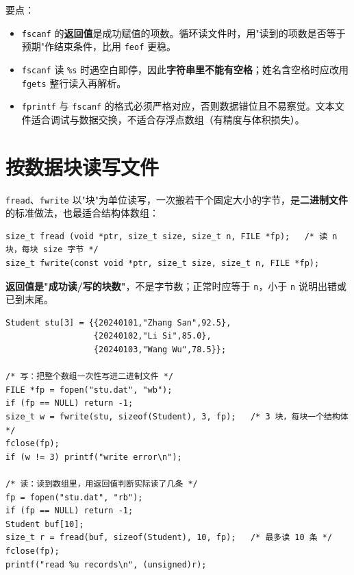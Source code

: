 要点：
\begin{itemize}
  \item \texttt{fscanf} 的\textbf{返回值}是成功赋值的项数。循环读文件时，用"读到的项数是否等于预期"作结束条件，比用 \texttt{feof} 更稳。
  \item \texttt{fscanf} 读 \texttt{\%s} 时遇空白即停，因此\textbf{字符串里不能有空格}；姓名含空格时应改用 \texttt{fgets} 整行读入再解析。
  \item \texttt{fprintf} 与 \texttt{fscanf} 的格式必须严格对应，否则数据错位且不易察觉。文本文件适合调试与数据交换，不适合存浮点数组（有精度与体积损失）。
\end{itemize}

\section{按数据块读写文件}
\texttt{fread}、\texttt{fwrite} 以"块"为单位读写，一次搬若干个固定大小的字节，是\textbf{二进制文件}的标准做法，也最适合结构体数组：
\begin{lstlisting}
size_t fread (void *ptr, size_t size, size_t n, FILE *fp);   /* 读 n 块，每块 size 字节 */
size_t fwrite(const void *ptr, size_t size, size_t n, FILE *fp);
\end{lstlisting}
\textbf{返回值是"成功读/写的块数"}，不是字节数；正常时应等于 \texttt{n}，小于 \texttt{n} 说明出错或已到末尾。

\begin{lstlisting}
Student stu[3] = {{20240101,"Zhang San",92.5},
                  {20240102,"Li Si",85.0},
                  {20240103,"Wang Wu",78.5}};

/* 写：把整个数组一次性写进二进制文件 */
FILE *fp = fopen("stu.dat", "wb");
if (fp == NULL) return -1;
size_t w = fwrite(stu, sizeof(Student), 3, fp);   /* 3 块，每块一个结构体 */
fclose(fp);
if (w != 3) printf("write error\n");

/* 读：读到数组里，用返回值判断实际读了几条 */
fp = fopen("stu.dat", "rb");
if (fp == NULL) return -1;
Student buf[10];
size_t r = fread(buf, sizeof(Student), 10, fp);   /* 最多读 10 条 */
fclose(fp);
printf("read %u records\n", (unsigned)r);
\end{lstlisting}


